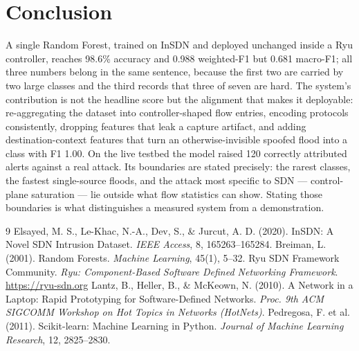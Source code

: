 \documentclass[11pt]{article}
\begin{document}
\section{Conclusion}
A single Random Forest, trained on InSDN and deployed unchanged inside a Ryu controller,
reaches 98.6\% accuracy and 0.988 weighted-F1 but 0.681 macro-F1; all three numbers belong
in the same sentence, because the first two are carried by two large classes and the third
records that three of seven are hard. The system's contribution is not the headline score
but the alignment that makes it deployable: re-aggregating the dataset into
controller-shaped flow entries, encoding protocols consistently, dropping features that
leak a capture artifact, and adding destination-context features that turn an
otherwise-invisible spoofed flood into a class with F1 1.00. On the live testbed the model
raised 120 correctly attributed alerts against a real attack. Its boundaries are stated
precisely: the rarest classes, the fastest single-source floods, and the attack most
specific to SDN --- control-plane saturation --- lie outside what flow statistics can
show. Stating those boundaries is what distinguishes a measured system from a
demonstration.

\begin{thebibliography}{9}
 Elsayed, M. S., Le-Khac, N.-A., Dev, S., \& Jurcut, A. D. (2020). InSDN:
A Novel SDN Intrusion Dataset. \emph{IEEE Access}, 8, 165263--165284.
 Breiman, L. (2001). Random Forests. \emph{Machine Learning}, 45(1), 5--32.
 Ryu SDN Framework Community. \emph{Ryu: Component-Based Software Defined
Networking Framework}. \url{https://ryu-sdn.org}
 Lantz, B., Heller, B., \& McKeown, N. (2010). A Network in a Laptop:
Rapid Prototyping for Software-Defined Networks. \emph{Proc. 9th ACM SIGCOMM Workshop on
Hot Topics in Networks (HotNets)}.
 Pedregosa, F. et al. (2011). Scikit-learn: Machine Learning in Python.
\emph{Journal of Machine Learning Research}, 12, 2825--2830.
\end{thebibliography}
\end{document}
